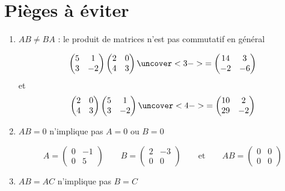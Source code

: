 \section{Pièges à éviter}

\begin{frame}

\begin{enumerate}
\item  $AB\neq BA$ : le produit de matrices n'est pas commutatif en général 

\pause
\begin{exemple}
$$\begin{pmatrix}
5&1\\3&-2
\end{pmatrix}
\begin{pmatrix}
2&0\\4&3
\end{pmatrix}
\uncover<3->{
=
\begin{pmatrix}
14&3\\-2&-6
\end{pmatrix}
}$$
et
$$
\begin{pmatrix}
2&0\\4&3
\end{pmatrix}
\begin{pmatrix}
5&1\\3&-2
\end{pmatrix}
\uncover<4->{
=
\begin{pmatrix}
10&2\\29&-2
\end{pmatrix}
}
$$
\end{exemple}
\pause\pause
  \item\pause $AB=0$ n'implique pas $A=0$ ou $B=0$
  
\pause
\begin{exemple}
$$
A  = \begin{pmatrix}
 0 & -1\\
 0 & 5\end{pmatrix}\qquad B  = 
\begin{pmatrix}
2 & -3\\
0 & 0 \end{pmatrix}
\qquad \text{et} \qquad 
 AB  =  \begin{pmatrix}
 0 & 0\\
 0 & 0\end{pmatrix}
$$
\end{exemple}

\pause

  \item $AB=AC$ n'implique pas $B=C$
  


\end{enumerate}
\end{frame}

